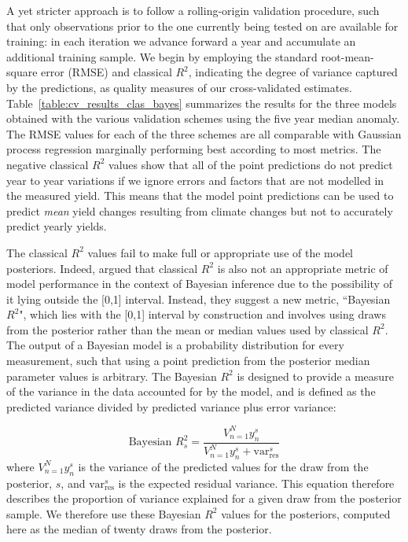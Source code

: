 \documentclass[12pt]{article}
\begin{document}
A yet stricter approach is to follow a rolling-origin validation procedure, such that only observations prior to the one currently being tested on are available for training: in each iteration we advance forward a year and accumulate an additional training sample. We begin by employing the standard root-mean-square error (RMSE) and classical $R^2$, indicating the degree of variance captured by the predictions, as quality measures of our cross-validated estimates. Table~\ref{table:cv_results_clas_bayes} summarizes the results for the three models obtained with the various validation schemes using the five year median anomaly. The RMSE values for each of the three schemes are all comparable with Gaussian process regression marginally performing best according to most metrics. The negative classical $R^2$ values show that all of the point predictions do not predict year to year variations if we ignore errors and factors that are not modelled in the measured yield. This means that the model point predictions can be used to predict \emph{mean} yield changes resulting from climate changes but not to accurately predict yearly yields.

The classical $R^2$ values fail to make full or appropriate use of the model posteriors. Indeed, \citet{Gelman:2019} argued that classical $R^2$ is also not an appropriate metric of model performance in the context of Bayesian inference due to the possibility of it lying outside the [0,1] interval. Instead, they suggest a new metric, ``Bayesian $R^2$", which lies with the [0,1] interval by construction and involves using draws from the posterior rather than the mean or median values used by classical $R^2$. The output of a Bayesian model is a probability distribution for every measurement, such that using a point prediction from the posterior median parameter values is arbitrary. The Bayesian $R^2$ is designed to provide a measure of the variance in the data accounted for by the model, and is defined as the predicted variance divided by predicted variance plus error variance:

\begin{equation}
\label{eq}
\textrm{Bayesian } R^2_s = \frac{V^N_{n=1} y_n^{ s} }{V^N_{n=1} y_n^{ s}  + \textrm{var}^s_{\mathrm{res}}}
\end{equation}
where $V^N_{n=1} y_n^{s}$ is the variance of the predicted values for the draw from the posterior, $s$, and $\textrm{var}^s_{\mathrm{res}}$ is the expected residual variance. This equation therefore describes the proportion of variance explained for a given draw from the posterior sample. We therefore use these Bayesian $R^2$ values for the posteriors, computed here as the median of twenty draws from the posterior. 
\end{document}
